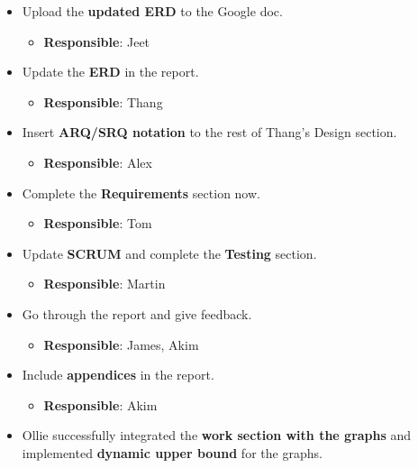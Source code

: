 \documentclass[11pt]{article}
\begin{document}
\begin{itemize}
\tightlist
\item
  Upload the \textbf{updated ERD} to the Google doc.

  \begin{itemize}
  \tightlist
  \item
    \textbf{Responsible}: Jeet
  \end{itemize}
\item
  Update the \textbf{ERD} in the report.

  \begin{itemize}
  \tightlist
  \item
    \textbf{Responsible}: Thang
  \end{itemize}
\item
  Insert \textbf{ARQ/SRQ notation} to the rest of Thang's Design
  section.

  \begin{itemize}
  \tightlist
  \item
    \textbf{Responsible}: Alex
  \end{itemize}
\item
  Complete the \textbf{Requirements} section now.

  \begin{itemize}
  \tightlist
  \item
    \textbf{Responsible}: Tom
  \end{itemize}
\item
  Update \textbf{SCRUM} and complete the \textbf{Testing} section.

  \begin{itemize}
  \tightlist
  \item
    \textbf{Responsible}: Martin
  \end{itemize}
\item
  Go through the report and give feedback.

  \begin{itemize}
  \tightlist
  \item
    \textbf{Responsible}: James, Akim
  \end{itemize}
\item
  Include \textbf{appendices} in the report.

  \begin{itemize}
  \tightlist
  \item
    \textbf{Responsible}: Akim
  \end{itemize}
\item
  Ollie successfully integrated the \textbf{work section with the
  graphs} and implemented \textbf{dynamic upper bound} for the graphs.
\end{itemize}
\end{document}

